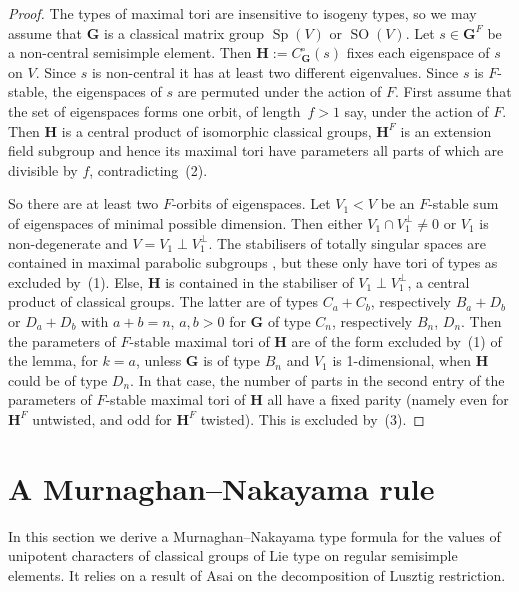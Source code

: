 \documentclass{ert-l}
\newcommand{\bG}{{\mathbf{G}}}
\newcommand{\bH}{{\mathbf{H}}}
\newcommand{\Sp}{{\operatorname{Sp}}}
\newcommand{\SO}{{\operatorname{SO}}}
\theoremstyle{definition}
\theoremstyle{remark}
\begin{document}
\begin{proof}
The types of maximal tori are insensitive to isogeny types, so we may assume
that $\bG$ is a classical matrix group $\Sp(V)$ or $\SO(V)$. Let
$s\in\bG^F$ be a non-central semisimple element.
Then $\bH:=C_\bG^\circ(s)$ fixes each eigenspace of $s$ on $V$. Since $s$ is
non-central it has at least two different eigenvalues. Since $s$ is $F$-stable,
the eigenspaces of $s$ are permuted under the action of $F$. First
assume that the set of eigenspaces forms one orbit, of length~$f>1$ say, under
the action of $F$. Then $\bH$ is a central product of isomorphic classical
groups, $\bH^F$ is an extension field subgroup and hence its maximal tori
have parameters all parts of which are divisible by $f$, contradicting~(2).
\par
So there are at least two $F$-orbits of eigenspaces. Let $V_1< V$ be an
$F$-stable sum of eigenspaces of minimal possible dimension. Then either
$V_1 \cap V_1^\perp \neq 0$ or $V_1$ is non-degenerate and $V = V_1 \perp
V_1^\perp$. The stabilisers
of totally singular spaces are contained in maximal parabolic subgroups
\cite[Prop.~12.13]{MT}, but these only have tori of types as excluded by~(1).
Else, $\bH$ is contained in the stabiliser of $V_1\perp V_1^\perp$, a central
product of
classical groups. The latter are of types $C_a+C_b$, respectively $B_a + D_b$
or $D_a + D_b$ with $a+b = n$, $a,b > 0$ for $\bG$ of type $C_n$, respectively
$B_n$, $D_n$. Then the parameters of $F$-stable maximal tori of $\bH$ are of
the form excluded by~(1) of the lemma, for $k=a$, unless $\bG$ is of type
$B_n$ and $V_1$ is 1-dimensional, when $\bH$ could be of type $D_n$.  In
that case, the number of parts in the second entry of the parameters of
$F$-stable maximal tori of $\bH$ all have a fixed parity (namely even for
$\bH^F$ untwisted, and odd for $\bH^F$ twisted). This is excluded by~(3).
\end{proof}


\section{A Murnaghan--Nakayama rule}   \label{sec:MNrule}

In this section we derive a Murnaghan--Nakayama type formula for the values
of unipotent characters of classical groups of Lie type on regular semisimple
elements. It relies on a result of Asai on the decomposition of Lusztig
restriction.
\end{document}
